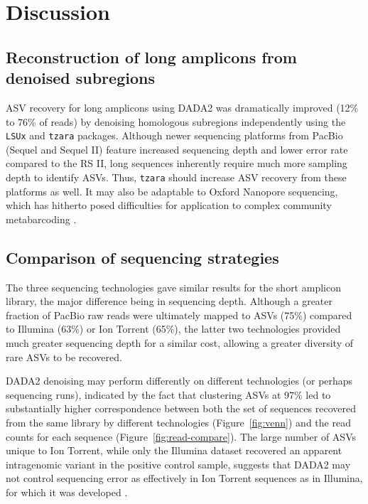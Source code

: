 \documentclass[
  12pt,
]{article}
\begin{document}
\hypertarget{discussion}{%
\section{Discussion}\label{discussion}}

\hypertarget{reconstruction-of-long-amplicons-from-denoised-subregions}{%
\subsection{Reconstruction of long amplicons from denoised subregions}\label{reconstruction-of-long-amplicons-from-denoised-subregions}}

ASV recovery for long amplicons using DADA2 was dramatically improved (12\% to 76\% of reads) by denoising homologous subregions independently using the \texttt{LSUx} and \texttt{tzara} packages.
Although newer sequencing platforms from PacBio (Sequel and Sequel II) feature increased sequencing depth and lower error rate compared to the RS II, long sequences inherently require much more sampling depth to identify ASVs.
Thus, \texttt{tzara} should increase ASV recovery from these platforms as well.
It may also be adaptable to Oxford Nanopore sequencing, which has hitherto posed difficulties for application to complex community metabarcoding \autocite{loit2019}.

\hypertarget{comparison-of-sequencing-strategies}{%
\subsection{Comparison of sequencing strategies}\label{comparison-of-sequencing-strategies}}

The three sequencing technologies gave similar results for the short amplicon library, the major difference being in sequencing depth.
Although a greater fraction of PacBio raw reads were ultimately mapped to ASVs (75\%) compared to Illumina (63\%) or Ion Torrent (65\%),
the latter two technologies provided much greater sequencing depth for a similar cost, allowing a greater diversity of rare ASVs to be recovered.

DADA2 denoising may perform differently on different technologies (or perhaps sequencing runs), indicated by the fact that clustering ASVs at 97\% led to substantially higher correspondence between both the set of sequences recovered from the same library by different technologies (Figure~\ref{fig:venn}) and the read counts for each sequence (Figure~\ref{fig:read-compare}).
The large number of ASVs unique to Ion Torrent, while only the Illumina dataset recovered an apparent intragenomic variant in the positive control sample, suggests that DADA2 may not control sequencing error as effectively in Ion Torrent sequences as in Illumina, for which it was developed \autocite{callahan2016}.
\end{document}

